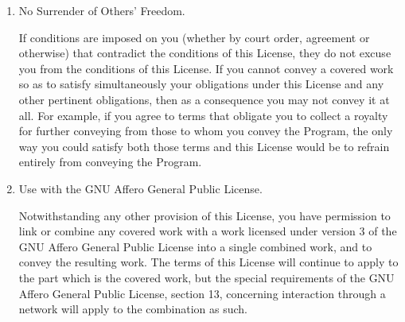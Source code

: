 \documentclass[11pt]{article}
\begin{document}
\begin{enumerate}
A patent license is ``discriminatory'' if it does not include within
the scope of its coverage, prohibits the exercise of, or is
conditioned on the non-exercise of one or more of the rights that are
specifically granted under this License.  You may not convey a covered
work if you are a party to an arrangement with a third party that is
in the business of distributing software, under which you make payment
to the third party based on the extent of your activity of conveying
the work, and under which the third party grants, to any of the
parties who would receive the covered work from you, a discriminatory
patent license (a) in connection with copies of the covered work
conveyed by you (or copies made from those copies), or (b) primarily
for and in connection with specific products or compilations that
contain the covered work, unless you entered into that arrangement,
or that patent license was granted, prior to 28 March 2007.

Nothing in this License shall be construed as excluding or limiting
any implied license or other defenses to infringement that may
otherwise be available to you under applicable patent law.

\item No Surrender of Others' Freedom.

If conditions are imposed on you (whether by court order, agreement or
otherwise) that contradict the conditions of this License, they do not
excuse you from the conditions of this License.  If you cannot convey a
covered work so as to satisfy simultaneously your obligations under this
License and any other pertinent obligations, then as a consequence you may
not convey it at all.  For example, if you agree to terms that obligate you
to collect a royalty for further conveying from those to whom you convey
the Program, the only way you could satisfy both those terms and this
License would be to refrain entirely from conveying the Program.

\item Use with the GNU Affero General Public License.

Notwithstanding any other provision of this License, you have
permission to link or combine any covered work with a work licensed
under version 3 of the GNU Affero General Public License into a single
combined work, and to convey the resulting work.  The terms of this
License will continue to apply to the part which is the covered work,
but the special requirements of the GNU Affero General Public License,
section 13, concerning interaction through a network will apply to the
combination as such.


\end{enumerate}
\end{document}
